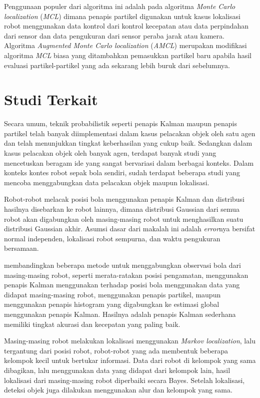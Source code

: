 Penggunaan populer dari algoritma ini adalah pada algoritma \textit{Monte Carlo localization} (\textit{MCL}) dimana penapis partikel digunakan untuk kasus lokalisasi robot menggunakan data kontrol dari kontrol kecepatan atau data perpindahan dari sensor dan data pengukuran dari sensor peraba jarak atau kamera. Algoritma \textit{Augmented Monte Carlo localization} (\textit{AMCL}) merupakan modifikasi algoritma \textit{MCL} biasa yang ditambahkan pemasukkan partikel baru apabila hasil evaluasi partikel-partikel yang ada sekarang lebih buruk dari sebelumnya.

\section{Studi Terkait}

Secara umum, teknik probabilistik seperti penapis Kalman maupun penapis partikel telah banyak diimplementasi dalam kasus pelacakan objek oleh satu agen dan telah menunjukkan tingkat keberhasilan yang cukup baik. Sedangkan dalam kasus pelacakan objek oleh banyak agen, terdapat banyak studi yang mencetuskan beragam ide yang sangat bervariasi dalam berbagai konteks. Dalam konteks kontes robot sepak bola sendiri, sudah terdapat beberapa studi yang mencoba menggabungkan data pelacakan objek maupun lokalisasi.

Robot-robot \cite{stroupe2001} melacak posisi bola menggunakan penapis Kalman dan distribusi hasilnya disebarkan ke robot lainnya, dimana distribusi Gaussian dari semua robot akan digabungkan oleh masing-masing robot untuk menghasilkan suatu distribusi Gaussian akhir. Asumsi dasar dari makalah ini adalah \textit{error}nya bersifat normal independen, lokalisasi robot sempurna, dan waktu pengukuran bersamaan.

\cite{ferrein2005} membandingkan beberapa metode untuk menggabungkan observasi bola dari masing-masing robot, seperti merata-ratakan posisi pengamatan, menggunakan penapis Kalman menggunakan terhadap posisi bola menggunakan data yang didapat masing-masing robot, menggunakan penapis partikel, maupun menggunakan penapis histogram yang digabungkan ke estimasi global menggunakan penapis Kalman. Hasilnya adalah penapis Kalman sederhana memiliki tingkat akurasi dan kecepatan yang paling baik.

Masing-masing robot \cite{pahliani2006} melakukan lokalisasi menggunakan \textit{Markov localization}, lalu tergantung dari posisi robot, robot-robot yang ada membentuk beberapa kelompok kecil untuk bertukar informasi. Data dari robot di kelompok yang sama dibagikan, lalu menggunakan data yang didapat dari kelompok lain, hasil lokalisasi dari masing-masing robot diperbaiki secara Bayes. Setelah lokalisasi, deteksi objek juga dilakukan menggunakan alur dan kelompok yang sama.

